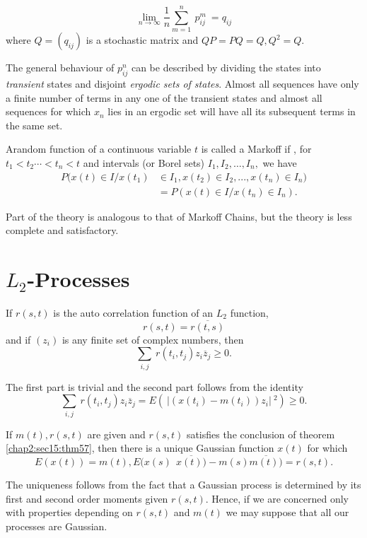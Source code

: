 \begin{theorem}\label{chap2:sec14:thm56}%
  $$
  \lim\limits_{n \rightarrow \infty} 
  \frac{1}{n} \sum\limits_{m=1}^{n}~p_{ij}^m~=q_{ij}
  $$
  where $Q=(q_{ij})$ is a stochastic matrix and  $QP=PQ=Q,Q^2=Q $.

  The general behaviour of $p_{ij}^n$ can be described by dividing
  the states into \textit{transient} states and disjoint \textit{ergodic sets of
    states}. Almost all sequences have only a finite number of terms in
  any one of the transient states and almost all sequences for which
  $x_n$ lies in 
  an ergodic set will have all its subsequent terms in the same set.
  
  A\pageoriginale random function of a continuous variable $t$ is called a Markoff if ,
  for $t_1 <t_2 \cdots <t_n <t$ and intervals (or Borel sets)
  $I_1,I_2,\ldots ,I_n,$ we have 
  \begin{align*}
    P(x(t)\in I/x(t_1)& \in I_1, x(t_2)\in I_2,..., x(t_n)\in I_n)\\
    &=P(x(t) \in I/x(t_n)\in I_n).
  \end{align*}
  
  Part of the theory is analogous to that of Markoff Chains, but the
  theory is less complete and satisfactory. 
\end{theorem}

\section{\texorpdfstring{$L_2$}{L2}-Processes}\label{chap2:sec15} 

\begin{theorem}\label{chap2:sec15:thm57} %
  If $r(s,t)$ is the auto correlation function of an $L_2$ function,
  $$
  r(s,t)=\overline{r(t,s)}
  $$
  and if $(z_i)$ is any finite set of complex numbers, then
  $$
  \sum_{i,j} ~r(t_i,t_j) z_i \overline{z}_j \ge 0.
  $$

  The first part is trivial and the second part follows from the identity
  $$
  \sum\limits_{i,j}~r(t_i,t_j)z_i \overline{z}_j
  =E(~|(x(t_i)-m(t_i))z_i |~^2) \ge 0.
  $$ 
\end {theorem}

\begin{theorem}\label{chap2:sec15:thm58}  %
  If $m(t),r(s,t)$ are given and $r(s,t)$ satisfies the conclusion of
  theorem \ref{chap2:sec15:thm57}, then there is a unique Gaussian function $x(t)$ for which  
  $$
  E(x(t))=m(t),E(x(s) ~~\overline{x(t))} -m(s)\overline{m(t))}= r(s,t).
  $$\pageoriginale 
  
  The uniqueness follows from the fact that a Gaussian process
  is determined by its first and second order moments given $r(s,t)$.  Hence,
  if we are concerned only with properties depending on $r(s,t)$ and $m(t)$
  we may suppose that all our processes are Gaussian.
\end{theorem}

